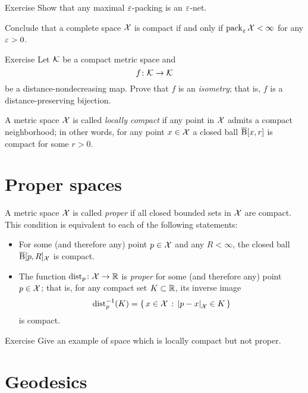 \begin{thm}{Exercise}\label{ex:pack-net}
Show that any maximal $\varepsilon$-packing is an $\varepsilon$-net.

Conclude that a complete space $\mathcal{X}$ is compact if and only if $\pack_\eps\spc{X}\z<\infty$ for any $\varepsilon>0$.
\end{thm}


\begin{thm}{Exercise}\label{ex:non-contracting-map}
Let $\mathcal{K}$  be a compact metric space and
\[f\:\spc{K}\z\to \spc{K}\] 
be a distance-nondecreasing map.
Prove that $f$ is an \emph{isometry};
that is, $f$ is a distance-preserving bijection.
\end{thm}

A metric space $\mathcal{X}$ is called \emph{locally compact} if any point in $\mathcal{X}$ admits a compact neighborhood;
in other words, for any point $x\in\mathcal{X}$ a closed ball $\overline{\mathrm{B}}{}[x,r]$ is compact for some $r>0$.

\section{Proper spaces}

A metric space $\mathcal{X}$ is called \emph{proper} if all closed bounded sets in $\mathcal{X}$ are compact. 
This condition is equivalent to each of the following statements:
\begin{itemize}
\item For some (and therefore any) point $p\in \mathcal{X}$ and any $R<\infty$, 
the closed ball $\overline{\mathrm{B}}{}[p,R]_{\mathcal{X}}$ is compact. 
\item The function $\mathrm{dist}_p\colon\mathcal{X}\to\mathbb{R}$ is \emph{proper} for some (and therefore any) point $p\in \mathcal{X}$;
that is, for any compact set $K\subset \mathbb{R}$, its inverse image 
\[\distfun_p^{-1}(K)=\set{x\in \spc{X}}{\dist{p}{x}{\spc{X}}\in K}\]
is compact.
\end{itemize}

\begin{thm}{Exercise}\label{ex:loc-compact-not-proper}
Give an example of space which is locally compact but not proper.
\end{thm}

\section{Geodesics}
\label{sec:geods}

